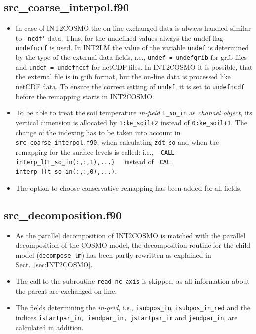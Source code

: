 \documentclass[11pt,twoside]{article}
\begin{document}
\subsection{src\_coarse\_interpol.f90}
\begin{itemize}
\item In case of INT2COSMO the on-line exchanged data is always handled
similar to \verb|'ncdf'| data. 
Thus, for the undefined values always the undef flag
\verb|undefncdf| is used. In INT2LM the value of the variable \verb|undef| is
determined by the type of the external data fields, i.e., 
\verb|undef = undefgrib|
for grib-files and \verb|undef = undefncdf| for netCDF-files.
In INT2COSMO it is possible, that the external file is in
grib format, but the on-line data is processed like netCDF data. 
To ensure the correct setting of \verb|undef|, it is set to \verb|undefncdf| 
before the remapping starts in INT2COSMO.
 
\item To be able to treat the soil temperature {\it in-field} \verb|t_so_in|
as {\it channel object}, its vertical dimension is allocated by 
\verb|1:ke_soil+2| instead of \verb|0:ke_soil+1|. The change of the 
indexing has to be taken into 
account in \verb|src_coarse_interpol.f90|, when calculating \verb|zdt_so|
and when the remapping for the surface levels is called:
i.e.,\ \verb| CALL interp_l(t_so_in(:,:,1),...)  | instead of 
\verb| CALL interp_l(t_so_in(:,:,0),...)|.
\item The option to choose conservative remapping has been added for
all fields.
\end{itemize}
\subsection{src\_decomposition.f90}
\begin{itemize}
\item As the parallel decomposition of INT2COSMO is matched with the parallel
decomposition of the COSMO model, 
the decomposition routine for the child model (\verb|decompose_lm|)
has been partly rewritten as explained in Sect.\ \ref{sec:INT2COSMO}.
\item The call to the subroutine \verb|read_nc_axis| is skipped, as all
information about the parent are exchanged on-line.
\item The fields determining the {\it in-grid},
i.e., \verb|isubpos_in|, \verb|isubpos_in_red| and the
indices \verb|istartpar_in, iendpar_in, jstartpar_in|
and \verb|jendpar_in|,
are calculated in addition.
\end{itemize}
\end{document}
